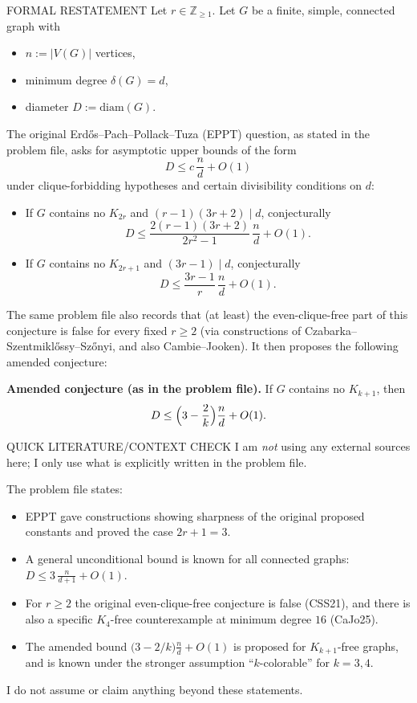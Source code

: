 FORMAL RESTATEMENT
Let $r\in\mathbb{Z}_{\ge 1}$. Let $G$ be a finite, simple, connected graph with
\begin{itemize}
\item $n:=|V(G)|$ vertices,
\item minimum degree $\delta(G)=d$,
\item diameter $D:=\mathrm{diam}(G)$.
\end{itemize}
The original Erd\H{o}s--Pach--Pollack--Tuza (EPPT) question, as stated in the
problem file, asks for asymptotic upper bounds of the form
\[
D \le c\,\frac{n}{d} + O(1)
\]
under clique-forbidding hypotheses and certain divisibility conditions on $d$:
\begin{itemize}
\item If $G$ contains no $K_{2r}$ and $(r-1)(3r+2)\mid d$, conjecturally
\[
D \le \frac{2(r-1)(3r+2)}{2r^2-1}\,\frac{n}{d}+O(1).
\]
\item If $G$ contains no $K_{2r+1}$ and $(3r-1)\mid d$, conjecturally
\[
D \le \frac{3r-1}{r}\,\frac{n}{d}+O(1).
\]
\end{itemize}
The same problem file also records that (at least) the even-clique-free part of
this conjecture is false for every fixed $r\ge 2$ (via constructions of
Czabarka--Szentmikl\H{o}ssy--Sz\H{o}nyi, and also Cambie--Jooken).
It then proposes the following amended conjecture:

\medskip
\noindent\textbf{Amended conjecture (as in the problem file).}
If $G$ contains no $K_{k+1}$, then
\[
D \le \Bigl(3-\frac{2}{k}\Bigr)\frac{n}{d} + O(1).
\]

QUICK LITERATURE/CONTEXT CHECK
I am \emph{not} using any external sources here; I only use what is explicitly
written in the problem file.

The problem file states:
\begin{itemize}
\item EPPT gave constructions showing sharpness of the original proposed
constants and proved the case $2r+1=3$.
\item A general unconditional bound is known for all connected graphs:
$D\le 3\,\frac{n}{d+1}+O(1)$.
\item For $r\ge2$ the original even-clique-free conjecture is false (CSS21), and
there is also a specific $K_4$-free counterexample at minimum degree $16$ (CaJo25).
\item The amended bound $\bigl(3-2/k\bigr)\frac{n}{d}+O(1)$ is proposed for
$K_{k+1}$-free graphs, and is known under the stronger assumption
``$k$-colorable'' for $k=3,4$.
\end{itemize}
I do not assume or claim anything beyond these statements.

